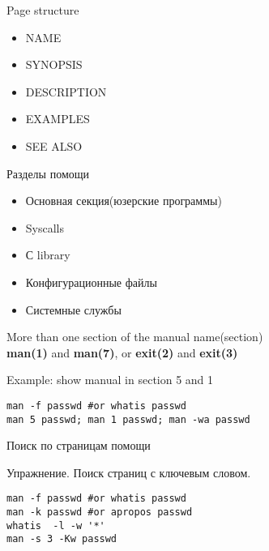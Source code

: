 \begin{frame}[fragile]{Page structure}
		\begin{itemize}
			\item NAME
			\item SYNOPSIS
			\item DESCRIPTION
			\item EXAMPLES
			\item SEE ALSO
		\end{itemize}
\end{frame}

\begin{frame}[fragile]{Разделы помощи}
	\begin{itemize}
		\item[1] Основная секция(юзерские программы)
		\item[2] Syscalls
		\item[3] С library
		\item[5] Конфигурационные файлы
		\item[8] Системные службы
	\end{itemize}
\end{frame}

\begin{frame}[fragile]{More than one section of the manual}
	name(section)  \\ 
	\textbf{man(1)} and \textbf{man(7)}, or \textbf{exit(2)} and \textbf{exit(3)} \\
     \begin{block}{Example: show manual in section 5 and 1}
        \begin{lstlisting}
man -f passwd #or whatis passwd 
man 5 passwd; man 1 passwd; man -wa passwd
        \end{lstlisting}
    \end{block}
\end{frame}

\begin{frame}[fragile]{Поиск по страницам помощи}
     \begin{block}{Упражнение. Поиск страниц с ключевым словом.}
        \begin{lstlisting}
man -f passwd #or whatis passwd 
man -k passwd #or apropos passwd 
whatis  -l -w '*'
man -s 3 -Kw passwd
        \end{lstlisting}
    \end{block}
\end{frame}


